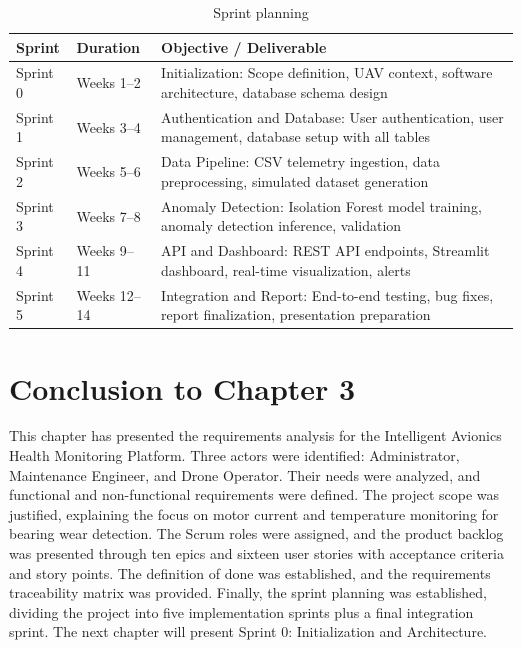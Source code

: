 \begin{table}[H]
\centering
\caption{Sprint planning}
\begin{tabular}{|p{2cm}|p{3cm}|p{8cm}|}
\hline
\textbf{Sprint} & \textbf{Duration} & \textbf{Objective / Deliverable} \\
\hline
Sprint 0 & Weeks 1–2 & Initialization: Scope definition, UAV context, software architecture, database schema design \\
\hline
Sprint 1 & Weeks 3–4 & Authentication and Database: User authentication, user management, database setup with all tables \\
\hline
Sprint 2 & Weeks 5–6 & Data Pipeline: CSV telemetry ingestion, data preprocessing, simulated dataset generation \\
\hline
Sprint 3 & Weeks 7–8 & Anomaly Detection: Isolation Forest model training, anomaly detection inference, validation \\
\hline
Sprint 4 & Weeks 9–11 & API and Dashboard: REST API endpoints, Streamlit dashboard, real-time visualization, alerts \\
\hline
Sprint 5 & Weeks 12–14 & Integration and Report: End-to-end testing, bug fixes, report finalization, presentation preparation \\
\hline
\end{tabular}
\end{table}

\section*{Conclusion to Chapter 3}

This chapter has presented the requirements analysis for the Intelligent Avionics Health Monitoring Platform. Three actors were identified: Administrator, Maintenance Engineer, and Drone Operator. Their needs were analyzed, and functional and non-functional requirements were defined. The project scope was justified, explaining the focus on motor current and temperature monitoring for bearing wear detection. The Scrum roles were assigned, and the product backlog was presented through ten epics and sixteen user stories with acceptance criteria and story points. The definition of done was established, and the requirements traceability matrix was provided. Finally, the sprint planning was established, dividing the project into five implementation sprints plus a final integration sprint. The next chapter will present Sprint 0: Initialization and Architecture.

